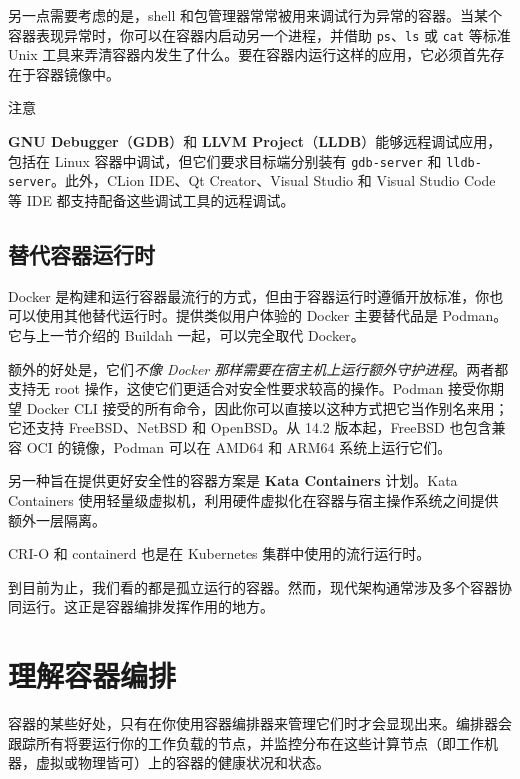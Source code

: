 另一点需要考虑的是，shell 和包管理器常常被用来调试行为异常的容器。当某个容器表现异常时，你可以在容器内启动另一个进程，并借助 \texttt{ps}、\texttt{ls} 或 \texttt{cat} 等标准 Unix 工具来弄清容器内发生了什么。要在容器内运行这样的应用，它必须首先存在于容器镜像中。

\begin{myNotic}{注意}

\label{idx:1795}
\label{idx:1796}
\textbf{GNU Debugger}（\textbf{GDB}）和 \textbf{LLVM Project}（\textbf{LLDB}）能够远程调试应用，包括在 Linux 容器中调试，但它们要求目标端分别装有 \texttt{gdb-server} 和 \texttt{lldb-server}。此外，CLion IDE、Qt Creator、Visual Studio 和 Visual Studio Code 等 IDE 都支持配备这些调试工具的远程调试。
\end{myNotic}

\subsection{替代容器运行时}

\label{idx:1797}
Docker 是构建和运行容器最流行的方式，但由于容器运行时遵循开放标准，你也可以使用其他替代运行时。提供类似用户体验的 Docker 主要替代品是 Podman。它与上一节介绍的 Buildah 一起，可以完全取代 Docker。

额外的好处是，它们\emph{不像 Docker 那样需要在宿主机上运行额外守护进程}。两者都支持无 root 操作，这使它们更适合对安全性要求较高的操作。Podman 接受你期望 Docker CLI 接受的所有命令，因此你可以直接以这种方式把它当作别名来用；它还支持 FreeBSD、NetBSD 和 OpenBSD。从 14.2 版本起，FreeBSD 也包含兼容 OCI 的镜像，Podman 可以在 AMD64 和 ARM64 系统上运行它们。

\label{idx:1798}
另一种旨在提供更好安全性的容器方案是 \textbf{Kata Containers} 计划。Kata Containers 使用轻量级虚拟机，利用硬件虚拟化在容器与宿主操作系统之间提供额外一层隔离。

\label{idx:1799}
CRI-O 和 containerd 也是在 Kubernetes 集群中使用的流行运行时。

到目前为止，我们看的都是孤立运行的容器。然而，现代架构通常涉及多个容器协同运行。这正是容器编排发挥作用的地方。

\section{理解容器编排}

\label{idx:1800}
容器的某些好处，只有在你使用容器编排器来管理它们时才会显现出来。编排器会跟踪所有将要运行你的工作负载的节点，并监控分布在这些计算节点（即工作机器，虚拟或物理皆可）上的容器的健康状况和状态。

